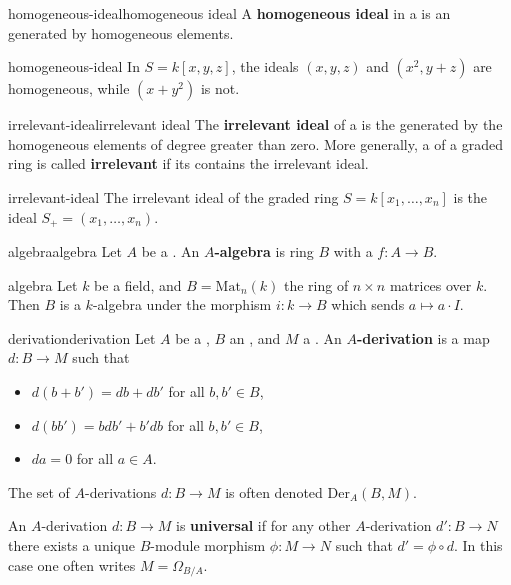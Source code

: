 \begin{topic}{homogeneous-ideal}{homogeneous ideal}
    A \textbf{homogeneous ideal} in a  is an  generated by homogeneous elements.
\end{topic}

\begin{example}{homogeneous-ideal}
    In $S = k[x, y, z]$, the ideals $(x, y, z)$ and $(x^2, y + z)$ are homogeneous, while $(x + y^2)$ is not.
\end{example}

\begin{topic}{irrelevant-ideal}{irrelevant ideal}
    The \textbf{irrelevant ideal} of a  is the  generated by the homogeneous elements of degree greater than zero. More generally, a  of a graded ring is called \textbf{irrelevant} if its  contains the irrelevant ideal.
\end{topic}

\begin{example}{irrelevant-ideal}
    The irrelevant ideal of the graded ring $S = k[x_1, \ldots, x_n]$ is the ideal $S_+ = (x_1, \ldots, x_n)$.
\end{example}

\begin{topic}{algebra}{algebra}
    Let $A$ be a . An \textbf{$A$-algebra} is ring $B$ with a  $f : A \to B$.
\end{topic}

\begin{example}{algebra}
    Let $k$ be a field, and $B = \text{Mat}_{n}(k)$ the ring of $n \times n$ matrices over $k$. Then $B$ is a $k$-algebra under the morphism $i : k \to B$ which sends $a \mapsto a \cdot I$.
\end{example}

\begin{topic}{derivation}{derivation}
    Let $A$ be a , $B$ an , and $M$ a . An \textbf{$A$-derivation} is a map $d : B \to M$ such that
    \begin{itemize}
        \item $d(b + b') = db + db'$ for all $b, b' \in B$,
        \item $d(bb') = bdb' + b'db$ for all $b, b' \in B$,
        \item $da = 0$ for all $a \in A$.
    \end{itemize}
    The set of $A$-derivations $d : B \to M$ is often denoted $\text{Der}_A(B, M)$.
    
    An $A$-derivation $d : B \to M$ is \textbf{universal} if for any other $A$-derivation $d' : B \to N$ there exists a unique $B$-module morphism $\phi : M \to N$ such that $d' = \phi \circ d$. In this case one often writes $M = \Omega_{B/A}$.
\end{topic}

